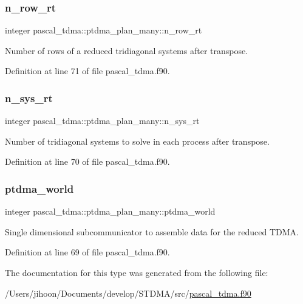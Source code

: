 \subsubsection{\texorpdfstring{n\_row\_rt}{n\_row\_rt}}
{\footnotesize\ttfamily integer pascal\+\_\+tdma\+::ptdma\+\_\+plan\+\_\+many\+::n\+\_\+row\+\_\+rt}



Number of rows of a reduced tridiagonal systems after transpose. 



Definition at line 71 of file pascal\+\_\+tdma.\+f90.

\mbox{\label{structpascal__tdma_1_1ptdma__plan__many_a22b42947ab742f83aad3bbeb3a42a0f6}} 
\subsubsection{\texorpdfstring{n\_sys\_rt}{n\_sys\_rt}}
{\footnotesize\ttfamily integer pascal\+\_\+tdma\+::ptdma\+\_\+plan\+\_\+many\+::n\+\_\+sys\+\_\+rt}



Number of tridiagonal systems to solve in each process after transpose. 



Definition at line 70 of file pascal\+\_\+tdma.\+f90.

\mbox{\label{structpascal__tdma_1_1ptdma__plan__many_acb7e645e37c791564905c6e2808db0c6}} 
\subsubsection{\texorpdfstring{ptdma\_world}{ptdma\_world}}
{\footnotesize\ttfamily integer pascal\+\_\+tdma\+::ptdma\+\_\+plan\+\_\+many\+::ptdma\+\_\+world}



Single dimensional subcommunicator to assemble data for the reduced T\+D\+MA. 



Definition at line 69 of file pascal\+\_\+tdma.\+f90.



The documentation for this type was generated from the following file\+:\begin{DoxyCompactItemize}
\item 
/\+Users/jihoon/\+Documents/develop/\+S\+T\+D\+M\+A/src/\mbox{\hyperlink{pascal__tdma_8f90}{pascal\+\_\+tdma.\+f90}}\end{DoxyCompactItemize}
